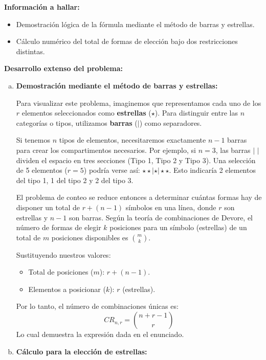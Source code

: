 \documentclass[a4paper]{article}
\begin{document}
\textbf{Información a hallar:}
\begin{itemize}
    \item Demostración lógica de la fórmula mediante el método de barras y estrellas.
    \item Cálculo numérico del total de formas de elección bajo dos restricciones distintas.
\end{itemize}

\textbf{Desarrollo extenso del problema:}

\begin{enumerate}[a.]
    \item \textbf{Demostración mediante el método de barras y estrellas:}
    
    Para visualizar este problema, imaginemos que representamos cada uno de los $r$ elementos seleccionados como \textbf{estrellas} ($\star$). Para distinguir entre las $n$ categorías o tipos, utilizamos \textbf{barras} ($|$) como separadores.
    
    Si tenemos $n$ tipos de elementos, necesitaremos exactamente $n - 1$ barras para crear los compartimentos necesarios. Por ejemplo, si $n=3$, las barras $|$ $|$ dividen el espacio en tres secciones (Tipo 1, Tipo 2 y Tipo 3). Una selección de 5 elementos ($r=5$) podría verse así: $\star \star | \star | \star \star$. Esto indicaría 2 elementos del tipo 1, 1 del tipo 2 y 2 del tipo 3.
    
    El problema de conteo se reduce entonces a determinar cuántas formas hay de disponer un total de $r + (n - 1)$ símbolos en una línea, donde $r$ son estrellas y $n - 1$ son barras. Según la teoría de combinaciones de Devore, el número de formas de elegir $k$ posiciones para un símbolo (estrellas) de un total de $m$ posiciones disponibles es $\binom{m}{k}$.
    
    Sustituyendo nuestros valores:
    \begin{itemize}
        \item Total de posiciones ($m$): $r + (n - 1)$.
        \item Elementos a posicionar ($k$): $r$ (estrellas).
    \end{itemize}
    
    Por lo tanto, el número de combinaciones únicas es:
    $$ CR_{n,r} = \binom{n + r - 1}{r} $$
    Lo cual demuestra la expresión dada en el enunciado.

    \item \textbf{Cálculo para la elección de estrellas:}
    

\end{enumerate}
\end{document}
